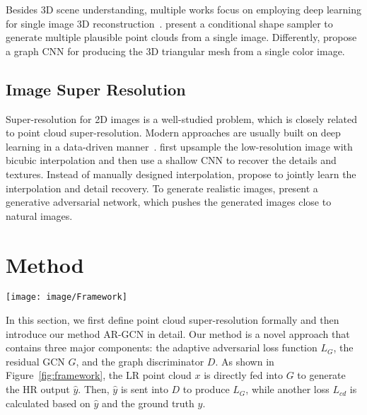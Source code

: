 \documentclass[10pt,twocolumn,letterpaper]{article}
\begin{document}
Besides 3D scene understanding, multiple works focus on employing deep learning for single image 3D reconstruction~\cite{fan2017point,wang2018pixel2mesh,sun2018pix3d,kato2018neural}.
\cite{fan2017point} present a conditional shape sampler to generate multiple plausible point clouds from a single image.
Differently, \cite{wang2018pixel2mesh} propose a graph CNN for producing the 3D triangular mesh from a single color image.

\subsection{Image Super Resolution}
Super-resolution for 2D images is a well-studied problem, which is closely related to point cloud super-resolution.
Modern approaches are usually built on deep learning in a data-driven manner~\cite{dong2014learning, wang2016end, ledig2017photo, zhang2018residual, han2018image, haris2018deep}.
\cite{dong2014learning} first upsample the low-resolution image with bicubic interpolation and then use a shallow CNN to recover the details and textures.
Instead of manually designed interpolation, \cite{wang2016end} propose to jointly learn the interpolation and detail recovery.
To generate realistic images, \cite{ledig2017photo} present a generative adversarial network, which pushes the generated images close to natural images.

\section{Method}
\begin{figure*}
\begin{center}
    \texttt{[image: image/Framework]}
\end{center}
	\vspace{-1.5em}
	\caption{\textbf{Framework Overview.} The proposed AR-GCN consists of a generator $G$ and a discriminator $D$. $G$ is a residual GCN that upsamples the input point cloud progressively with the upsampling ratio $2\times$. $D$ is also a residual GCN, which learns to distinguish fake HR point cloud from the real one.}
	\vspace{-1em}
	\label{fig:framework}
\end{figure*}

In this section, we first define point cloud super-resolution formally and then introduce our method AR-GCN in detail.
Our method is a novel approach that contains three major components: the adaptive adversarial loss function $L_G$, the residual GCN $G$, and the graph discriminator $D$.
As shown in Figure~\ref{fig:framework}, the LR point cloud $x$ is directly fed into $G$ to generate the HR output $\hat{y}$.
Then, $\hat{y}$ is sent into $D$ to produce $L_G$, while another loss $L_{cd}$ is calculated based on $\hat{y}$ and the ground truth $y$.
\end{document}
